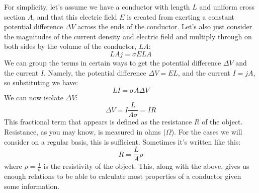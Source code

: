 For simplicity, let's assume we have a conductor with length $L$ and uniform cross section $A$, and that this electric field $E$ is created from exerting a constant potential difference $\Delta V$ across the ends of the conductor. Let's also just consider the magnitudes of the current density and electric field and multiply through on both sides by the volume of the conductor, $LA$:
\[
	L A j = \sigma E L A
\]
We can group the terms in certain ways to get the potential difference $\Delta V$ and the current $I$. Namely, the potential difference $\Delta V = EL$, and the current $I = jA$, so substituting we have:
\[
	LI = \sigma A \Delta V
\]
We can now isolate $\Delta V$:
\[
	\Delta V = I \frac{L}{A\sigma} = IR
\]
This fractional term that appears is defined as the resistance $R$ of the object. Resistance, as you may know, is measured in ohms ($\Omega$).  For the cases we will consider on a regular basis, this is sufficient. Sometimes it's written like this:
\[
	R = \frac{L}{A}\rho
\]
where $\rho = \frac{1}{\sigma}$ is the resistivity of the object. This, along with the above, gives us enough relations to be able to calculate most properties of a conductor given some information. 
